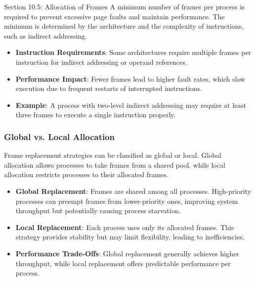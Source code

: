 \begin{notes}{Section 10.5: Allocation of Frames}
    A minimum number of frames per process is required to prevent excessive page faults and maintain performance. The minimum is determined by the architecture and the complexity of instructions, such 
    as indirect addressing.
    
    \begin{highlight}
    
    \begin{itemize}
        \item \textbf{Instruction Requirements}: Some architectures require multiple frames per instruction for indirect addressing or operand references.
        \item \textbf{Performance Impact}: Fewer frames lead to higher fault rates, which slow execution due to frequent restarts of interrupted instructions.
        \item \textbf{Example}: A process with two-level indirect addressing may require at least three frames to execute a single instruction properly.
    \end{itemize}
    
    \end{highlight}
    
    \subsubsection*{Global vs. Local Allocation}
    
    Frame replacement strategies can be classified as global or local. Global allocation allows processes to take frames from a shared pool, while local allocation restricts processes to their allocated frames.
    
    \begin{highlight}
    
    \begin{itemize}
        \item \textbf{Global Replacement}: Frames are shared among all processes. High-priority processes can preempt frames from lower-priority ones, improving system throughput but potentially causing process starvation.
        \item \textbf{Local Replacement}: Each process uses only its allocated frames. This strategy provides stability but may limit flexibility, leading to inefficiencies.
        \item \textbf{Performance Trade-Offs}: Global replacement generally achieves higher throughput, while local replacement offers predictable performance per process.
    \end{itemize}
    

\end{highlight}
\end{notes}
